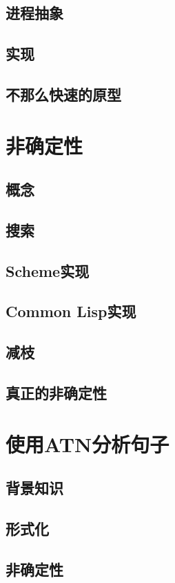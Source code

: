 \documentclass{ctexart}
\begin{document}
\subsection{进程抽象}
\label{sec-21-1}
\subsection{实现}
\label{sec-21-2}
\subsection{不那么快速的原型}
\label{sec-21-3}
\section{非确定性}
\label{sec-22}
\subsection{概念}
\label{sec-22-1}
\subsection{搜索}
\label{sec-22-2}
\subsection{Scheme实现}
\label{sec-22-3}
\subsection{Common Lisp实现}
\label{sec-22-4}
\subsection{减枝}
\label{sec-22-5}
\subsection{真正的非确定性}
\label{sec-22-6}
\section{使用ATN分析句子}
\label{sec-23}
\subsection{背景知识}
\label{sec-23-1}
\subsection{形式化}
\label{sec-23-2}
\subsection{非确定性}
\label{sec-23-3}
\end{document}
